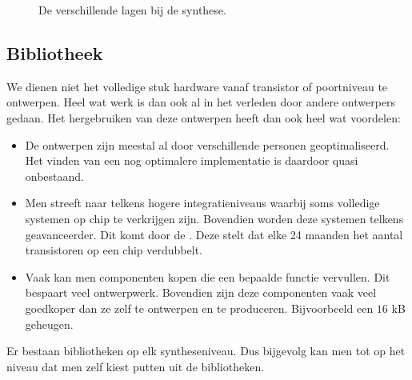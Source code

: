 \begin{figure}[htb]
\centering
{}
\caption{De verschillende lagen bij de synthese.}
\end{figure}

\subsection{Bibliotheek}
We dienen niet het volledige stuk hardware vanaf transistor of poortniveau te ontwerpen. Heel wat werk is dan ook al in het verleden door andere ontwerpers gedaan. Het hergebruiken van deze ontwerpen heeft dan ook heel wat voordelen:
\begin{itemize}
 \item De ontwerpen zijn meestal al door verschillende personen geoptimaliseerd. Het vinden van een nog optimalere implementatie is daardoor quasi onbestaand.
 \item Men streeft naar telkens hogere integratieniveaus waarbij soms volledige systemen op chip te verkrijgen zijn. Bovendien worden deze systemen telkens geavanceerder. Dit komt door de . Deze stelt dat elke 24 maanden het aantal transistoren op een chip verdubbelt.
 \item Vaak kan men componenten kopen die een bepaalde functie vervullen. Dit bespaart veel ontwerpwerk. Bovendien zijn deze componenten vaak veel goedkoper dan ze zelf te ontwerpen en te produceren. Bijvoorbeeld een $16$ kB geheugen.
\end{itemize}
Er bestaan bibliotheken op elk syntheseniveau. Dus bijgevolg kan men tot op het niveau dat men zelf kiest putten uit de bibliotheken.

